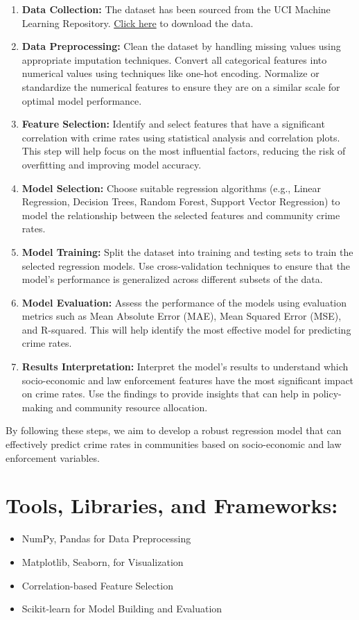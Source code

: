 \documentclass{article}
\begin{document}
\begin{enumerate}
    \item \textbf{Data Collection:} The dataset has been sourced from the UCI Machine Learning Repository. \href{https://archive.ics.uci.edu/dataset/211/communities+and+crime+unnormalized}{Click here} to download the data.

    \item \textbf{Data Preprocessing:} Clean the dataset by handling missing values using appropriate imputation techniques. Convert all categorical features into numerical values using techniques like one-hot encoding. Normalize or standardize the numerical features to ensure they are on a similar scale for optimal model performance.

    \item \textbf{Feature Selection:} Identify and select features that have a significant correlation with crime rates using statistical analysis and correlation plots. This step will help focus on the most influential factors, reducing the risk of overfitting and improving model accuracy.

    \item \textbf{Model Selection:} Choose suitable regression algorithms (e.g., Linear Regression, Decision Trees, Random Forest, Support Vector Regression) to model the relationship between the selected features and community crime rates.

    \item \textbf{Model Training:} Split the dataset into training and testing sets to train the selected regression models. Use cross-validation techniques to ensure that the model's performance is generalized across different subsets of the data.

    \item \textbf{Model Evaluation:} Assess the performance of the models using evaluation metrics such as Mean Absolute Error (MAE), Mean Squared Error (MSE), and R-squared. This will help identify the most effective model for predicting crime rates.

    \item \textbf{Results Interpretation:} Interpret the model's results to understand which socio-economic and law enforcement features have the most significant impact on crime rates. Use the findings to provide insights that can help in policy-making and community resource allocation.
\end{enumerate}

By following these steps, we aim to develop a robust regression model that can effectively predict crime rates in communities based on socio-economic and law enforcement variables.


\section*{Tools, Libraries, and Frameworks:}

\begin{itemize}
    \item NumPy, Pandas for Data Preprocessing
    \item Matplotlib, Seaborn,  for Visualization
    \item Correlation-based Feature Selection
    \item Scikit-learn for Model Building and Evaluation

\end{itemize}
\end{document}
